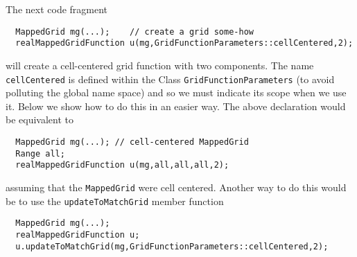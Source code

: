 The next code fragment
{\footnotesize  
\begin{verbatim} 
  MappedGrid mg(...);    // create a grid some-how
  realMappedGridFunction u(mg,GridFunctionParameters::cellCentered,2); 
\end{verbatim}  
}  
will create a cell-centered grid function with two components. The name {\tt cellCentered} is defined
within the Class {\tt GridFunctionParameters} (to avoid polluting the global name space) and so we must
indicate its scope when we use it. Below we show how to do this in an easier way. 
The above declaration would be equivalent to
{\footnotesize  
\begin{verbatim} 
  MappedGrid mg(...); // cell-centered MappedGrid
  Range all;
  realMappedGridFunction u(mg,all,all,all,2);
\end{verbatim}  
}  
assuming that the {\tt MappedGrid} were cell centered. 
Another way to do this would be to use the {\tt updateToMatchGrid} member function
{\footnotesize  
\begin{verbatim} 
  MappedGrid mg(...); 
  realMappedGridFunction u;
  u.updateToMatchGrid(mg,GridFunctionParameters::cellCentered,2);
\end{verbatim}  
}  

